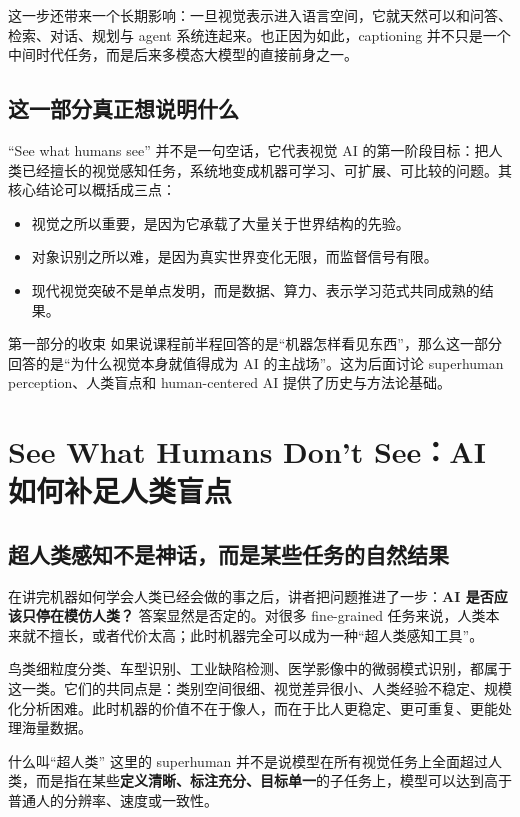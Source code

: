 \documentclass[a4paper]{article}
\begin{document}
这一步还带来一个长期影响：一旦视觉表示进入语言空间，它就天然可以和问答、检索、对话、规划与 agent 系统连起来。也正因为如此，captioning 并不只是一个中间时代任务，而是后来多模态大模型的直接前身之一。

\subsection{这一部分真正想说明什么}

``See what humans see'' 并不是一句空话，它代表视觉 AI 的第一阶段目标：把人类已经擅长的视觉感知任务，系统地变成机器可学习、可扩展、可比较的问题。其核心结论可以概括成三点：

\begin{itemize}
    \item 视觉之所以重要，是因为它承载了大量关于世界结构的先验。
    \item 对象识别之所以难，是因为真实世界变化无限，而监督信号有限。
    \item 现代视觉突破不是单点发明，而是数据、算力、表示学习范式共同成熟的结果。
\end{itemize}

\begin{importantbox}{第一部分的收束}
如果说课程前半程回答的是``机器怎样看见东西''，那么这一部分回答的是``为什么视觉本身就值得成为 AI 的主战场''。这为后面讨论 superhuman perception、人类盲点和 human-centered AI 提供了历史与方法论基础。
\end{importantbox}

\section{See What Humans Don't See：AI 如何补足人类盲点}

\subsection{超人类感知不是神话，而是某些任务的自然结果}

在讲完机器如何学会人类已经会做的事之后，讲者把问题推进了一步：\textbf{AI 是否应该只停在模仿人类？} 答案显然是否定的。对很多 fine-grained 任务来说，人类本来就不擅长，或者代价太高；此时机器完全可以成为一种``超人类感知工具''。

鸟类细粒度分类、车型识别、工业缺陷检测、医学影像中的微弱模式识别，都属于这一类。它们的共同点是：类别空间很细、视觉差异很小、人类经验不稳定、规模化分析困难。此时机器的价值不在于像人，而在于比人更稳定、更可重复、更能处理海量数据。

\begin{knowledgebox}{什么叫``超人类''}
这里的 superhuman 并不是说模型在所有视觉任务上全面超过人类，而是指在某些\textbf{定义清晰、标注充分、目标单一}的子任务上，模型可以达到高于普通人的分辨率、速度或一致性。
\end{knowledgebox}
\end{document}
